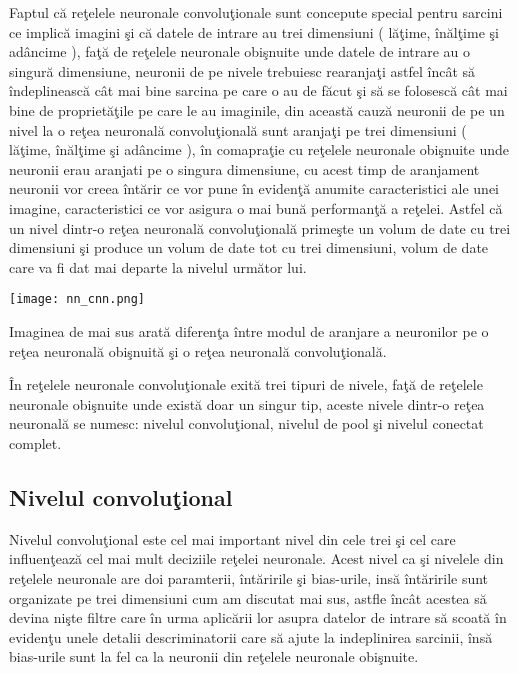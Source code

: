\par

Faptul c\u{a} re\c{t}elele neuronale convolu\c{t}ionale sunt concepute special pentru sarcini ce implic\u{a} imagini \c{s}i c\u{a} datele de intrare  au trei dimensiuni ( l\u{a}\c{t}ime, \^{i}n\u{a}l\c{t}ime \c{s}i ad\^{a}ncime ),  fa\c{t}\u{a} de re\c{t}elele neuronale obi\c{s}nuite unde datele de intrare au o singur\u{a} dimensiune, neuronii de pe nivele trebuiesc rearanja\c{t}i astfel \^{i}nc\^{a}t s\u{a} \^{i}ndeplineasc\u{a} c\^{a}t mai bine sarcina pe care o au de f\u{a}cut \c{s}i s\u{a} se folosesc\u{a} c\^{a}t mai bine de propriet\u{a}\c{t}ile pe care le au imaginile, din aceast\u{a} cauz\u{a} neuronii de pe un nivel la o re\c{t}ea neuronal\u{a} convolu\c{t}ional\u{a} sunt aranja\c{t}i pe trei dimensiuni ( l\u{a}\c{t}ime, \^{i}n\u{a}l\c{t}ime \c{s}i ad\^{a}ncime ), \^{i}n comapra\c{t}ie cu re\c{t}elele neuronale obi\c{s}nuite unde neuronii erau aranjati pe o singura dimensiune, cu acest timp de aranjament neuronii vor creea \^{i}nt\u{a}rir ce vor pune \^{i}n eviden\c{t}\u{a} anumite caracteristici ale unei imagine, caracteristici ce vor asigura o mai bun\u{a} performan\c{t}\u{a} a re\c{t}elei. Astfel c\u{a} un nivel dintr-o re\c{t}ea neuronal\u{a} convolu\c{t}ional\u{a} prime\c{s}te un volum de date cu trei dimensiuni \c{s}i produce un volum de date tot cu trei dimensiuni, volum de date care va fi dat mai departe la nivelul urm\u{a}tor lui.

\par 

\begin{center}
\texttt{[image: nn\_cnn.png]}
\end{center}

Imaginea de mai sus arat\u{a} diferen\c{t}a \^{i}ntre modul de aranjare a neuronilor pe o re\c{t}ea neuronal\u{a} obi\c{s}nuit\u{a} \c{s}i o re\c{t}ea neuronal\u{a} convolu\c{t}ional\u{a}.

\^{I}n re\c{t}elele neuronale convolu\c{t}ionale exit\u{a} trei tipuri de nivele, fa\c{t}\u{a} de re\c{t}elele neuronale obi\c{s}nuite unde exist\u{a} doar un singur tip, aceste nivele dintr-o re\c{t}ea neuronal\u{a} se numesc: nivelul convolu\c{t}ional, nivelul de pool \c{s}i nivelul conectat complet.

\subsection{Nivelul convolu\c{t}ional}

Nivelul convolu\c{t}ional este cel mai important nivel din cele trei \c{s}i cel care influen\c{t}eaz\u{a} cel mai mult deciziile re\c{t}elei neuronale. Acest nivel ca \c{s}i nivelele din re\c{t}elele neuronale are doi paramterii, \^{i}nt\u{a}ririle \c{s}i bias-urile, ins\u{a} \^{i}nt\u{a}ririle sunt organizate pe trei dimensiuni cum am discutat mai sus, astfle \^{i}nc\^{a}t acestea s\u{a} devina ni\c{s}te filtre care \^{i}n urma aplic\u{a}rii lor asupra datelor de intrare s\u{a} scoat\u{a} \^{i}n eviden\c{t}u unele detalii descriminatorii care s\u{a} ajute la indeplinirea sarcinii, \^{i}ns\u{a} bias-urile sunt la fel ca la neuronii din re\c{t}elele neuronale obi\c{s}nuite. 


